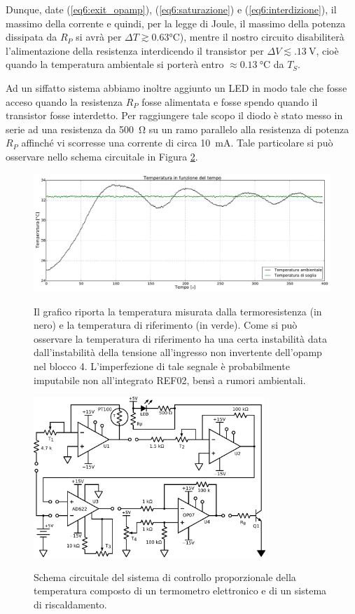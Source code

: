 Dunque, date (\ref{eq6:exit_opamp}), (\ref{eq6:saturazione}) e (\ref{eq6:interdizione}), il massimo della corrente e quindi, per la legge di Joule, il massimo della potenza dissipata da $R_P$ si avrà per $\Delta T \gtrsim 0.63 \si{\celsius}$), mentre il nostro circuito disabiliterà l'alimentazione della resistenza interdicendo il transistor per $\Delta V \lesssim \SI{.13}{\V}$, cioè quando la temperatura ambientale si porterà entro $\approx \SI{0.13}{\celsius}$ da $T_{S}$.


Ad un siffatto sistema abbiamo inoltre aggiunto un LED in modo tale che fosse acceso quando la resistenza $R_P$ fosse alimentata e fosse spendo quando il transistor fosse interdetto.
Per raggiungere tale scopo il diodo è stato messo in serie ad una resistenza da \SI{500}{\ohm} su un ramo parallelo alla resistenza di potenza $R_P$ affinché vi scorresse una corrente di circa \SI{10}{\mA}.
Tale particolare si può osservare nello schema circuitale in Figura \ref{gr6:proporzionale}.

\begin{figure}[ht]
 \centering
   {\includegraphics[width=1\textwidth]{../E06/latex/grafico.pdf}}
 \caption{Il grafico riporta la temperatura misurata dalla termoresistenza (in nero) e la temperatura di riferimento (in verde). Come si può osservare la temperatura di riferimento ha una certa instabilità data dall'instabilità della tensione all'ingresso non invertente dell'opamp nel blocco 4. L'imperfezione di tale segnale è probabilmente imputabile non all'integrato REF02, bensì a rumori ambientali.}
 \label{gr6:grafico}
\end{figure}

\begin{figure}[htc!]
 \centering
   {\includegraphics[width=0.78\textwidth]{../E06/latex/c2.pdf}}%
 \caption{Schema circuitale del sistema di controllo proporzionale della temperatura composto di un termometro elettronico e di un sistema di riscaldamento.}
 \label{gr6:proporzionale}
\end{figure}

